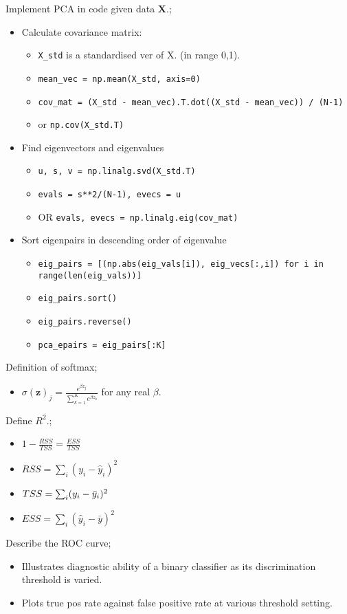 \documentclass{article}
\begin{document}
Implement PCA in code given data $\mathbf{X}$.; \begin{itemize} \item Calculate covariance matrix: \begin{itemize} \item \verb|X_std| is a standardised ver of X. (in range 0,1). \item \verb|mean_vec = np.mean(X_std, axis=0)| \item \verb|cov_mat = (X_std - mean_vec).T.dot((X_std - mean_vec)) / (N-1)| \item or \verb|np.cov(X_std.T)| \end{itemize} \item Find eigenvectors and eigenvalues \begin{itemize} \item \verb|u, s, v = np.linalg.svd(X_std.T)| \item \verb|evals = s**2/(N-1), evecs = u| \item OR \verb|evals, evecs = np.linalg.eig(cov_mat)| \end{itemize} \item Sort eigenpairs in descending order of eigenvalue \begin{itemize} \item \verb|eig_pairs = [(np.abs(eig_vals[i]), eig_vecs[:,i]) for i in range(len(eig_vals))]| \item \verb|eig_pairs.sort()| \item \verb|eig_pairs.reverse()| \item \verb|pca_epairs = eig_pairs[:K]| \end{itemize} \end{itemize}

Definition of softmax; \begin{itemize} \item $\sigma(\mathbf{z})_j = \frac{e^{\beta z_j}}{\sum_{k=1}^Ke^{\beta z_k}}$ for any real $\beta$. \end{itemize}

Define $R^2$.; \begin{itemize} \item $1-\frac{RSS}{TSS} = \frac{ESS}{TSS}$ \item $RSS = \sum_i(y_i-\hat{y}_i)^2$ \item $TSS=\sum_i(y_i-\Bar{y}_i)^2$ \item $ESS=\sum_i(\hat{y}_i - \bar{y})^2$ \end{itemize}

Describe the ROC curve; \begin{itemize} \item Illustrates diagnostic ability of a binary classifier as its discrimination threshold is varied. \item Plots true pos rate against false positive rate at various threshold setting. \end{itemize} 
\end{document}
